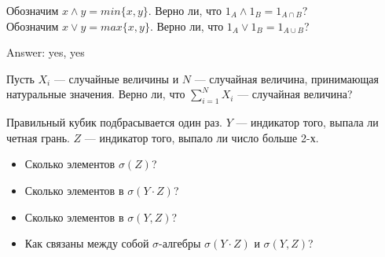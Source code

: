 \begin{solution}
\begin{problem}
Обозначим $x \wedge y = min\{x,y\}$. Верно ли, что $1_{A} \wedge
1_{B}=1_{A\cap B}$? \\
Обозначим $x \vee y = max\{x,y\}$. Верно ли, что $1_{A} \vee
1_{B}=1_{A\cup B}$? 
\end{problem} 
\begin{solution} 

Answer: yes, yes 
\end{solution}

\begin{problem}
Пусть $X_{i}$ --- случайные величины и $N$ --- случайная величина,
принимающая натуральные значения. Верно ли, что
$\sum_{i=1}^{N}X_{i}$ --- случайная величина? 
\end{problem} 
\begin{solution} 

\end{solution}

\begin{problem}
 Правильный кубик подбрасывается один раз. $Y$ --- индикатор того, выпала ли четная грань. $Z$ --- индикатор того, выпало ли число больше 2-х. \\
\begin{itemize}
\item Сколько элементов $\sigma(Z)$? 
\item Сколько элементов в $\sigma(Y\cdot Z)$? 
\item Сколько элементов в $\sigma(Y,Z)$? 
\item Как связаны между собой $ \sigma $-алгебры $\sigma(Y\cdot Z)$ и $\sigma(Y,Z)$?
\end{itemize}

\end{problem} 
\begin{solution} 

\end{solution}


\end{solution}
